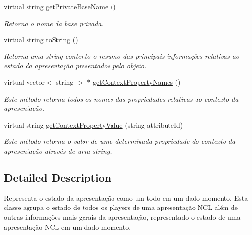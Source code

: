 \begin{DoxyCompactItemize}
virtual string \hyperlink{classbr_1_1ufscar_1_1lince_1_1ginga_1_1wac_1_1state_1_1PresentationState_a5b280537bd03a744eb41807859f01413}{getPrivateBaseName} ()
\begin{DoxyCompactList}\small\item\em Retorna o nome da base privada. \item\end{DoxyCompactList}\item 
virtual string \hyperlink{classbr_1_1ufscar_1_1lince_1_1ginga_1_1wac_1_1state_1_1PresentationState_a00ec06809774af254532488cc1559c15}{toString} ()
\begin{DoxyCompactList}\small\item\em Retorna uma string contento o resumo das principais informações relativas ao estado da apresentação presentados pelo objeto. \item\end{DoxyCompactList}\item 
virtual vector$<$ string $>$ $\ast$ \hyperlink{classbr_1_1ufscar_1_1lince_1_1ginga_1_1wac_1_1state_1_1PresentationState_ab5f9e22342f390d01e54ca51f8a85609}{getContextPropertyNames} ()
\begin{DoxyCompactList}\small\item\em Este método retorna todos os nomes das propriedades relativas ao contexto da apresentação. \item\end{DoxyCompactList}\item 
virtual string \hyperlink{classbr_1_1ufscar_1_1lince_1_1ginga_1_1wac_1_1state_1_1PresentationState_a2931ba17e6dcd1352382fee289352f4b}{getContextPropertyValue} (string attributeId)
\begin{DoxyCompactList}\small\item\em Este método retorna o valor de uma determinada propriedade do contexto da apresentação através de uma string. \item\end{DoxyCompactList}\end{DoxyCompactItemize}


\subsection{Detailed Description}
Representa o estado da apresentação como um todo em um dado momento. Esta classe agrupa o estado de todos os players de uma apresentação NCL além de outras informações mais gerais da apresentação, representado o estado de uma apresentação NCL em um dado momento. 

